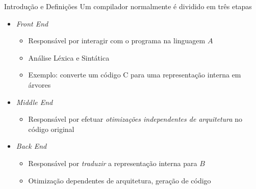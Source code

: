 \begin{frame}{Introdução e Definições}
  Um compilador normalmente é dividido em três etapas
  \begin{itemize}
    \item \textit{Front End}
        \begin{itemize}
            \item Responsável por interagir com o programa na linguagem $A$
            \item Análise Léxica e Sintática
            \item Exemplo: converte um código C para uma representação interna em árvores
        \end{itemize}
    \item \textit{Middle End}
        \begin{itemize}
            \item Responsável por efetuar \textit{otimizações independentes de arquitetura} no código original
        \end{itemize}
    \item \textit{Back End}
        \begin{itemize}
            \item Responsável por \textit{traduzir} a representação interna para $B$
            \item Otimização dependentes de arquitetura, geração de código
        \end{itemize}
  \end{itemize}
\end{frame}
